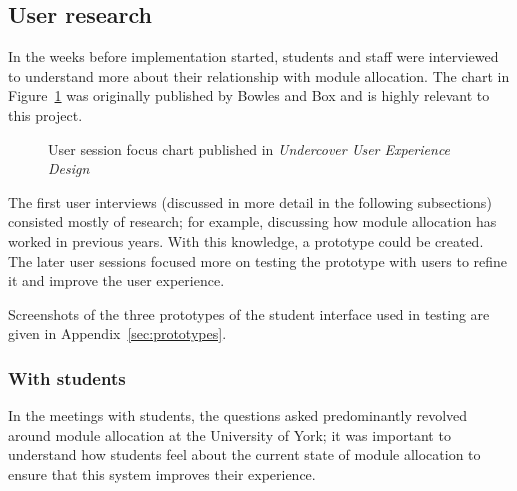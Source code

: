 
\subsection{User research}

In the weeks before implementation started, students and staff were
interviewed to understand more about their relationship with module
allocation. The chart in Figure~\ref{bowles_dualpurpose_chart} was originally
published by Bowles and Box and is highly relevant to this project.

\begin{figure}[h]
  \begin{center}
  \end{center}
  \caption{User session focus chart published in \emph{Undercover User Experience Design} \cite{bowles2011undercover}}
  \label{bowles_dualpurpose_chart}
\end{figure}

The first user interviews (discussed in more detail in the following
subsections) consisted mostly of research; for example, discussing how module
allocation has worked in previous years. With this knowledge, a prototype
could be created. The later user sessions focused more on testing the
prototype with users to refine it and improve the user experience.

Screenshots of the three prototypes of the student interface used in testing
are given in Appendix~\ref{sec:prototypes}.

\subsubsection{With students}

In the meetings with students, the questions asked predominantly revolved
around module allocation at the University of York; it was important to
understand how students feel about the current state of module allocation to
ensure that this system improves their experience.

